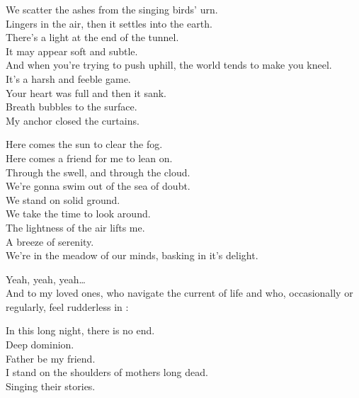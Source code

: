 
We scatter the ashes from the singing birds' urn. \\
Lingers in the air, then it settles into the earth. \\
There's a light at the end of the tunnel. \\
It may appear soft and subtle. \\
And when you're trying to push uphill, the world tends to make you kneel. \\
It's a harsh and feeble game. \\
Your heart was full and then it sank. \\
Breath bubbles to the surface. \\
My anchor closed the curtains. \\


Here comes the sun to clear the fog. \\
Here comes a friend for me to lean on. \\
Through the swell, and through the cloud. \\
We're gonna swim out of the sea of doubt. \\

We stand on solid ground. \\
We take the time to look around. \\
The lightness of the air lifts me. \\
A breeze of serenity. \\
We're in the meadow of our minds, basking in it's delight. \\




Yeah, yeah, yeah… \\
And to my loved ones, who navigate the current of life and who, occasionally or regularly, feel rudderless in : \\


In this long night, there is no end. \\
Deep dominion. \\
Father be my friend. \\
I stand on the shoulders of mothers long dead. \\
Singing their stories. \\

